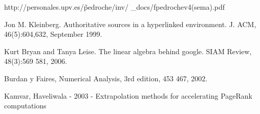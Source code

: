 \begin{thebibliography}{9}

  http://personales.upv.es/\~ pedroche/inv/ \_docs/fpedrochev4(sema).pdf

Jon M. Kleinberg. Authoritative sources in a hyperlinked environment. J. ACM,
46(5):604,632, September 1999.

Kurt Bryan and Tanya Leise. The linear algebra behind google. SIAM Review, 48(3):569
581, 2006.

Burdan y Faires, Numerical Analysis, 3rd edition, 453
467, 2002.

Kamvar, Haveliwala - 2003 - Extrapolation methods for accelerating PageRank computations


\end{thebibliography}